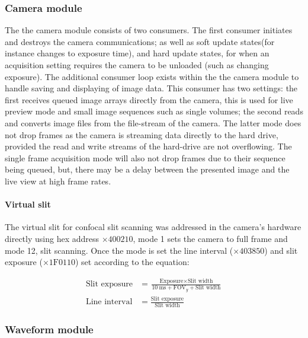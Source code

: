 \subsubsection{Camera module}

The the camera module consists of two consumers.
The first
consumer initiates and destroys the camera communications; as well as
soft update states(for instance changes to exposure time), and hard update states, for when an acquisition setting requires the camera to be unloaded (such as changing exposure).
The additional consumer loop exists within the the camera module to handle saving and displaying of image data.
This consumer has two settings: the first receives queued image arrays directly from the camera, this is used for live preview mode and small image sequences such as single volumes; the second reads and converts image files from the file-stream of the camera.
The latter mode does not drop frames as the camera is streaming data directly to the hard drive, provided the read and write streams of the hard-drive are not overflowing.
The single frame acquisition mode will also not drop frames due to their sequence being queued, but, there may be a delay between the presented image and the live view at high frame rates.

\paragraph{Virtual slit}

The virtual slit for confocal slit scanning was addressed in the camera's hardware directly using hex address $\times 400210$, mode 1 sets the camera to full frame and mode 12, slit scanning.
Once the mode is set the line interval ($\times 403850$) and slit exposure ($\times \text{1F0110}$) set according to the equation:

\begin{align}
    \text{Slit exposure} &= \frac{\text{Exposure} \times \text{Slit width}}{\SI{10}{\milli\second} + \text{FOV}_y + \text{Slit width}}\nonumber\\
    \text{Line interval} &= \frac{\text{Slit exposure}}{\text{Slit width}}\nonumber
\end{align}

\subsubsection{Waveform module}

